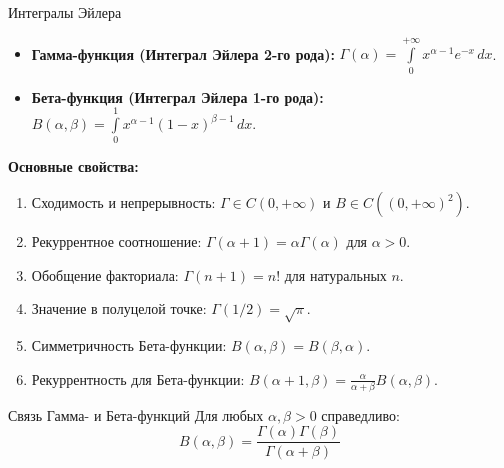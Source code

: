 \documentclass[12pt,a4paper]{article}
\begin{document}
\begin{Definition}{Интегралы Эйлера}{}
\begin{itemize}
    \item \textbf{Гамма-функция (Интеграл Эйлера 2-го рода):} $\Gamma(\alpha) = \int\limits_0^{+\infty} x^{\alpha-1} e^{-x} \, dx$.
    \item \textbf{Бета-функция (Интеграл Эйлера 1-го рода):} $B(\alpha, \beta) = \int\limits_0^1 x^{\alpha-1} (1-x)^{\beta-1} \, dx$.
\end{itemize}
\end{Definition}

\textbf{Основные свойства:}
\begin{enumerate}
    \item Сходимость и непрерывность: $\Gamma \in C(0, +\infty)$ и $B \in C((0, +\infty)^2)$.
    \item Рекуррентное соотношение: $\Gamma(\alpha + 1) = \alpha \Gamma(\alpha)$ для $\alpha > 0$.
    \item Обобщение факториала: $\Gamma(n + 1) = n!$ для натуральных $n$.
    \item Значение в полуцелой точке: $\Gamma(1/2) = \sqrt{\pi}$.
    \item Симметричность Бета-функции: $B(\alpha, \beta) = B(\beta, \alpha)$.
    \item Рекуррентность для Бета-функции: $B(\alpha+1, \beta) = \frac{\alpha}{\alpha+\beta} B(\alpha, \beta)$.
\end{enumerate}

\begin{Theorem}{Связь Гамма- и Бета-функций}{}
Для любых $\alpha, \beta > 0$ справедливо:
$$ B(\alpha, \beta) = \frac{\Gamma(\alpha)\Gamma(\beta)}{\Gamma(\alpha+\beta)} $$
\end{Theorem}
\end{document}
